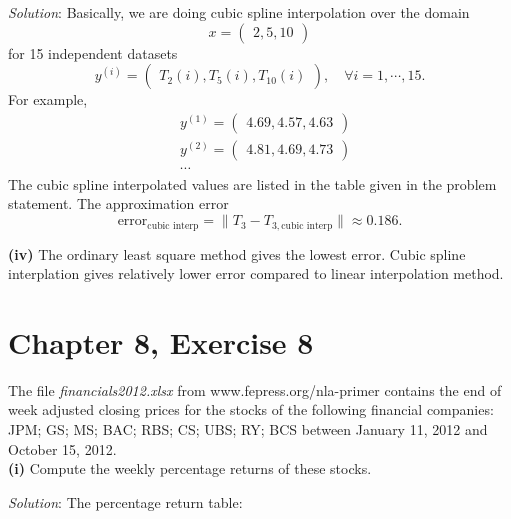 \documentclass[paper=a4, fontsize=11pt]{scrartcl} %
\numberwithin{equation}{section} %
\numberwithin{figure}{section} %
\numberwithin{table}{section} %
\begin{document}
\textit{Solution}: Basically, we are doing cubic spline interpolation over the domain 
$$
x =\begin{pmatrix}
2, 5, 10
\end{pmatrix}
$$
for 15 independent datasets
$$
y^{(i)} = \begin{pmatrix}
T_2(i),T_5(i),T_{10}(i)
\end{pmatrix}, \quad \forall i=1,\cdots,15.
$$
For example,
\begin{align}
\nonumber &y^{(1)} = \begin{pmatrix}
4.69, 4.57, 4.63
\end{pmatrix}\\
\nonumber &y^{(2)} = \begin{pmatrix}
4.81, 4.69, 4.73
\end{pmatrix}\\
\nonumber &\cdots
\end{align}
The cubic spline interpolated values are listed in the table given in the problem statement. The approximation error
$$
\text{error}_{\text{cubic interp}} = \parallel T_3 - T_{3,\text{cubic interp}}  \parallel
\approx 0.186.
$$

\textbf{(iv)} The ordinary least square method gives the lowest error. Cubic spline interplation gives relatively lower error compared to linear interpolation method.

 
 
\newpage

\section{Chapter 8, Exercise 8}
The file \textit{financials2012.xlsx} from www.fepress.org/nla-primer contains the end of week
adjusted closing prices for the stocks of the following financial companies: JPM; GS;
MS; BAC; RBS; CS; UBS; RY; BCS between January 11, 2012 and October 15, 2012.\\

\textbf{(i)} Compute the weekly percentage returns of these stocks.

\textit{Solution}: The percentage return table:\\

{\tiny
{}
}
\end{document}
